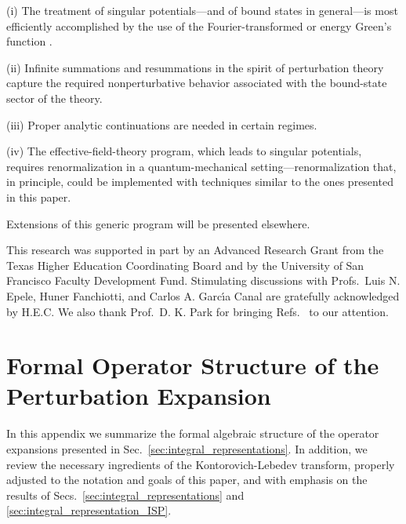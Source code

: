 \documentclass[a4paper,preprint,draft,showpacs,amsmath,amsfonts,amssymb,aps,prd]{revtex4}%
\begin{document}
(i)  The treatment of singular potentials---and of bound states in 
general---is most
efficiently accomplished by the use of 
the Fourier-transformed or energy Green's function \coordHE{}.

(ii) Infinite summations and resummations in the spirit of perturbation theory
capture
the required nonperturbative behavior associated with the bound-state
sector of the theory.
 
(iii) Proper analytic continuations are needed in certain regimes.

(iv) The effective-field-theory program, which  
leads to singular potentials, requires renormalization
in a quantum-mechanical setting---renormalization that,
in principle, could be implemented with
techniques similar to the ones presented in this paper.

Extensions of this generic program will be presented elsewhere.

\begin{acknowledgments}
This research was supported in part by
an Advanced Research Grant from the Texas
Higher Education Coordinating Board 
and by the University of San Francisco Faculty Development Fund.
Stimulating
discussions with Profs.\ 
Luis N. Epele, Huner Fanchiotti,
 and Carlos A. Garc\'{\i}a Canal
are gratefully acknowledged by H.E.C.
We also thank Prof.\ D. K. Park
for bringing Refs.~\cite{Randall-Sundrum,Park} to our attention.

\end{acknowledgments}

\appendix*

\section{Formal Operator Structure of the Perturbation Expansion}
\label{sec:formal_operator_expansion}


In this appendix we summarize the formal algebraic structure of the
operator expansions presented in Sec.~\ref{sec:integral_representations}.
In addition,
we review the necessary ingredients of the Kontorovich-Lebedev transform, 
properly adjusted to the notation and goals of this paper,
and with emphasis on the results of 
Secs.~\ref{sec:integral_representations} and \ref{sec:integral_representation_ISP}.
\end{document}
